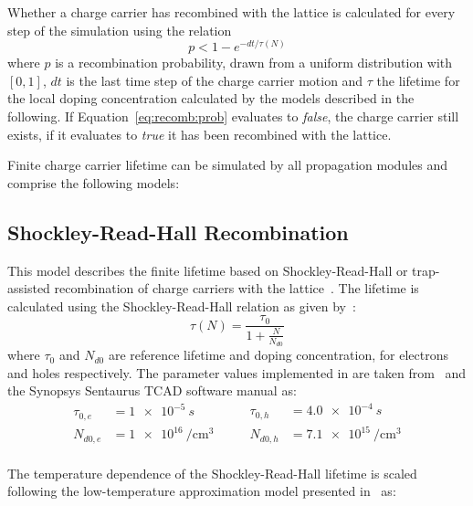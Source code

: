 Whether a charge carrier has recombined with the lattice is calculated for every step of the simulation using the relation
\begin{equation}
    \label{eq:recomb:prob}
    p < 1 - e^{- dt / \tau(N)}
\end{equation}
where $p$ is a recombination probability, drawn from a uniform distribution with $[0, 1]$, $dt$ is the last time step of the charge carrier motion and $\tau$ the lifetime for the local doping concentration calculated by the models described in the following.
If Equation~\eqref{eq:recomb:prob} evaluates to \emph{false}, the charge carrier still exists, if it evaluates to \emph{true} it has been recombined with the lattice.

Finite charge carrier lifetime can be simulated by all propagation modules and comprise the following models:

\subsection{Shockley-Read-Hall Recombination}

This model describes the finite lifetime based on Shockley-Read-Hall or trap-assisted recombination of charge carriers with the lattice~\cite{shockley-read,hall}.
The lifetime is calculated using the Shockley-Read-Hall relation as given by~\cite{fossum-lee}:
\begin{equation}
    \tau(N) = \frac{\tau_0}{1 + \frac{N}{N_{d0}}}
\end{equation}
where $\tau_0$ and $N_{d0}$ are reference lifetime and doping concentration, for electrons and holes respectively.
The parameter values implemented in \apsq are taken from~\cite{fossum-lee} and the Synopsys Sentaurus TCAD software manual as:
\begin{equation*}
    \begin{split}
        \tau_{0,e} &= \SI{1e-5}{s} \\
        N_{d0,e}   &= \SI{1e16}{\per \cubic \cm} \\
    \end{split}
    \qquad
    \begin{split}
        \tau_{0,h} &= \SI{4.0e-4}{s} \\
        N_{d0,h}   &= \SI{7.1e15}{\per \cubic \cm} \\
    \end{split}
\end{equation*}

The temperature dependence of the Shockley-Read-Hall lifetime is scaled following the low-temperature approximation model presented in~\cite{schenk} as:

